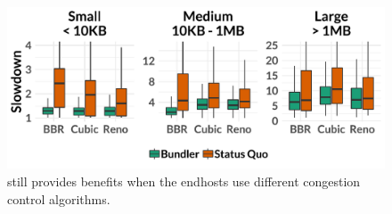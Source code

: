 \begin{figure}
    \centering
\begin{knitrout}
\color{fgcolor}
\includegraphics[width=\maxwidth]{figure/eval_e2e-1} 

\end{knitrout}
    \caption{\name still provides benefits when the endhosts use different congestion control algorithms.}
    \label{fig:eval:traffic}
\end{figure}
